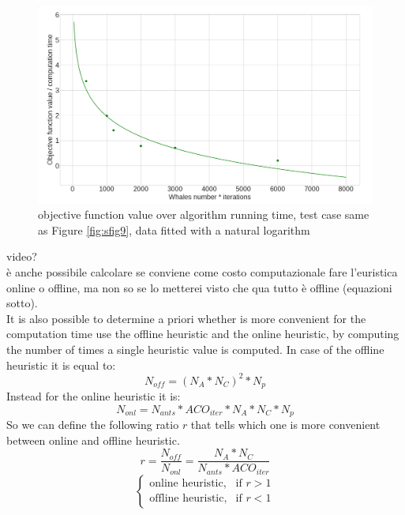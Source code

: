 \documentclass[twocolumn]{svjour3}
\newcommand{\rev}[1]{\textcolor{verde}{#1}}
\begin{document}
\begin{figure}[h]
		\includegraphics[width=1\linewidth]{objtime.png}
		\caption{ objective function value over algorithm running time, test case same as Figure \ref{fig:sfig9}, data fitted with a natural logarithm }
		\label{fig:sfig10}
\end{figure}

\rev{video?}\\
\rev{ è anche possibile calcolare se conviene come costo computazionale fare l'euristica online o offline, ma non so se lo metterei visto che qua tutto è offline (equazioni sotto).}\\

It is also possible to determine a priori whether is more convenient for the computation time use the offline heuristic and the online heuristic, by computing the number of times a single heuristic value is computed. In case of the offline heuristic it is equal to:
\begin{equation}
    N_{off} = (N_A * N_C)^2 * N_p
\end{equation}
Instead for the online heuristic it is:
\begin{equation}
    N_{onl} = N_{ants}*ACO_{iter}*N_A * N_C *N_p
\end{equation}
So we can define the following ratio $r$ that tells which one is more convenient between online and offline heuristic.
\begin{equation}
r = \frac{N_{off}}{N_{onl}} = \frac{N_A * N_C}{N_{ants}*ACO_{iter}}
\end{equation}
\begin{equation}
\begin{cases}
\text{online heuristic}, & \text{if }r>1   \\
\text{offline heuristic}, & \text{if } r<1
\end{cases}
\end{equation}
\end{document}
